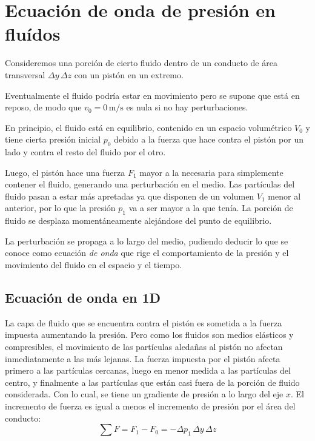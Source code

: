 \documentclass[a5paper,12pt,twoside]{book}
\begin{document}


\section{Ecuación de onda de presión en fluídos}

Consideremos una porción de cierto fluido dentro de un conducto de área transversal $\Delta y \, \Delta z$ con un pistón en un extremo. 

\begin{center}
    \def\svgwidth{0.8\linewidth}
    
\end{center}

Eventualmente el fluido podría estar en movimiento pero se supone que está en reposo, de modo que $v_0=0\,\si{\metre\per\second}$ es nula si no hay perturbaciones.

En principio, el fluido está en equilibrio, contenido en un espacio volumétrico $V_0$ y tiene cierta presión inicial $p_0$ debido a la fuerza que hace contra el pistón por un lado y contra el resto del fluido por el otro.

Luego, el pistón hace una fuerza $F_1$ mayor a la necesaria para simplemente contener el fluido, generando una perturbación en el medio. Las partículas del fluido pasan a estar más apretadas ya que disponen de un volumen $V_1$ menor al anterior, por lo que la presión $p_1$ va a ser mayor a la que tenía. La porción de fluido se desplaza momentáneamente alejándose del punto de equilibrio.

La perturbación se propaga a lo largo del medio, pudiendo deducir lo que se conoce como ecuación \emph{de onda} que rige el comportamiento de la presión y el movimiento del fluido en el espacio y el tiempo.

\subsection{Ecuación de onda en 1D}

La capa de fluido que se encuentra contra el pistón es sometida a la fuerza impuesta aumentando la presión. Pero como los fluidos son medios elásticos y compresibles, el movimiento de las partículas aledañas al pistón no afectan inmediatamente a las más lejanas. La fuerza impuesta por el pistón afecta primero a las partículas cercanas, luego en menor medida a las partículas del centro, y finalmente a las partículas que están casi fuera de la porción de fluido considerada. Con lo cual, se tiene un gradiente de presión a lo largo del eje $x$. El incremento de fuerza es igual a menos el incremento de presión por el área del conducto:
\begin{equation*}
    \sum F = F_1 - F_0 = - \Delta p_1 \, \Delta y \, \Delta z
\end{equation*}
\end{document}
